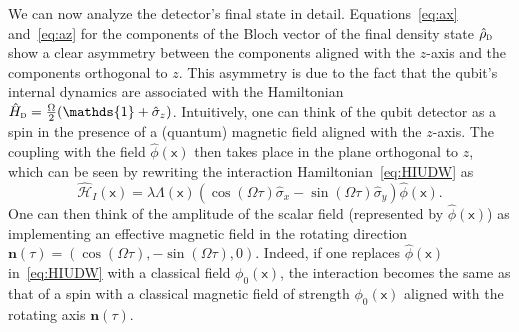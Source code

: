 \documentclass[letterpaper,12pt,titlepage,oneside,final]{book}
\newcommand{\openone}{\mathds{1}}
\newcommand{\mf}{\mathsf}%
\newcommand{\ii}{\mathrm{i}}
\newcommand{\s}{\hat{\sigma}}
\newcommand{\tc}[1]{\textsc{#1}}
\begin{document}
We can now analyze the detector's final state in detail. Equations~\eqref{eq:ax} and~\eqref{eq:az} for the components of the Bloch vector of the final density state $\hat{\rho}_\tc{d}$ show a clear asymmetry between the components aligned with the $z$-axis and the components orthogonal to $z$. This asymmetry is due to the fact that the qubit's internal dynamics are associated with the Hamiltonian $\hat{H}_\tc{d} = \frac{\Omega}{2}(\openone + \s_z)$. Intuitively, one can think of the qubit detector as a spin in the presence of a (quantum) magnetic field aligned with the $z$-axis. The coupling with the field $\hat{\phi}(\mf x)$ then takes place in the plane orthogonal to $z$, which can be seen by rewriting the interaction Hamiltonian~\eqref{eq:HIUDW} as
\begin{equation}
    \hat{\mathcal{H}}_I(\mf x) = \lambda \Lambda(\mf x)(\cos(\Omega \tau) \s_x - \sin(\Omega \tau) \s_y)\hat{\phi}(\mf x).
\end{equation}
One can then think of the amplitude of the scalar field (represented by $\hat{\phi}(\mf x)$) as implementing an effective magnetic field in the rotating direction $\bm n(\tau) = (\cos(\Omega \tau) , -\sin(\Omega \tau),0)$. Indeed, if one replaces $\hat{\phi}(\mf x)$ in~\eqref{eq:HIUDW} with a classical field $\phi_0(\mf x)$, the interaction becomes the same as that of a spin with a classical magnetic field of strength $\phi_0(\mf x)$ aligned with the rotating axis $\bm n(\tau)$.%
\end{document}
